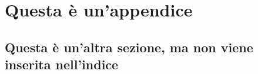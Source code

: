 \chapter{Questa è un'appendice}

\lipsum[5]

\section*{Questa è un'altra sezione, ma non viene inserita nell'indice}

\lipsum[6]
